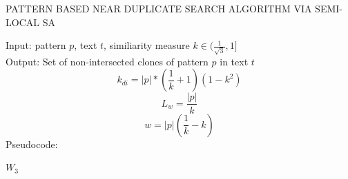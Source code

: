 \begin{algorithm}[!t]
\caption{PATTERN BASED NEAR DUPLICATE
SEARCH ALGORITHM VIA SEMI-LOCAL SA}
\label{alg:patternMathing1}
Input: pattern $p$, text $t$, similiarity measure $k \in  ( \frac{1}{\sqrt{3}} ,1  ]$\\
Output: Set of non-intersected clones of pattern $p$ in text $t$
\begin{equation}
    k_{di}=|p|*(\frac{1}{k}+1)(1-k^2)
\end{equation}
\begin{equation}
 L_{w} = \frac{|p|} {k}
\end{equation}
\begin{equation}
  w = |p|(\frac{1}{k} - k)
\end{equation}
Pseudocode:
\begin{algorithmic}[1]
\ENDIF
\ENDFOR
\RETURN $W_3$
\end{algorithmic}
\end{algorithm}

